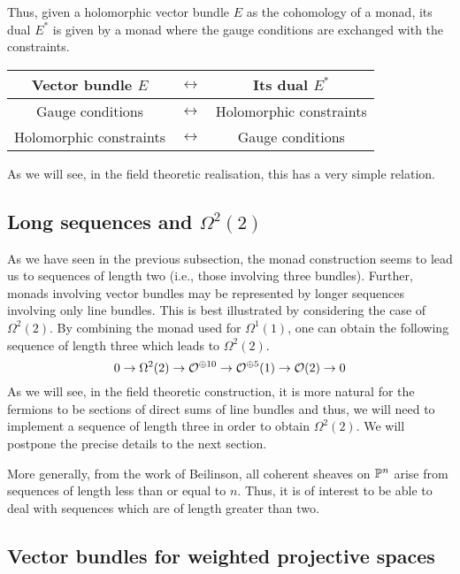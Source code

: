 \documentclass[a4paper,12pt]{article}
\begin{document}
Thus, given a holomorphic vector bundle $E$ as the cohomology of a
monad, its dual $E^\ast$  is given by a monad where
the gauge conditions are exchanged with the constraints.  
\begin{center}
\begin{tabular}{|ccc|}  \hline
Vector bundle $E$ &$\leftrightarrow$&  Its dual $E^\ast$ \\ \hline
Gauge conditions &$\leftrightarrow$& Holomorphic constraints \\
Holomorphic constraints &$\leftrightarrow$& 
Gauge conditions \\ \hline
\end{tabular}
\end{center}
As we will see, in the field theoretic realisation,
this has a very simple relation. 

 

\subsection{Long sequences and $\Omega^2(2)$}

As we have seen in the previous subsection, the monad construction
seems to lead us to sequences of length two (i.e., those involving
three bundles). Further, monads involving vector bundles may be
represented by longer sequences involving only line bundles. This is
best illustrated by considering the case of $\Omega^2(2)$. 
By combining the monad used for $\Omega^1(1)$, one can obtain
the following sequence of length three which leads to $\Omega^2(2)$.
\begin{equation}
0\rightarrow \Omega^{2}(2)
\rightarrow {\cal O}^{\oplus 10}\rightarrow
{\cal O}^{\oplus 5}(1)\rightarrow
{\cal O}(2)\rightarrow 0 
\end{equation}
As we will see, in the field theoretic construction, it is more natural
for the fermions to be sections of direct sums of line bundles and 
thus, we will need to implement a sequence of length three in order to
obtain $\Omega^2(2)$. We will postpone the precise details to the next
section.

More generally, from the work of Beilinson\cite{beilinson},
all coherent sheaves on
$\mathbb P^n$ arise from sequences of length less than or equal to $n$.
Thus, it is of interest to be able to deal with sequences which are of
length greater than two.

\subsection{Vector bundles for weighted projective spaces}
\label{secvbwpn}
\end{document}
